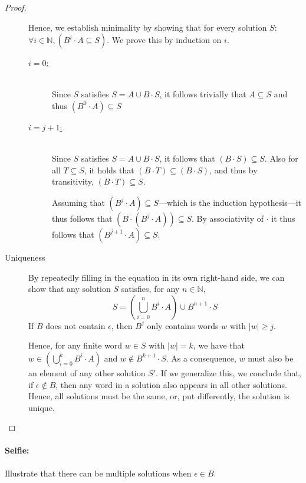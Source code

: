 \begin{proof}
\begin{description}
  Hence, we establish minimality by showing that for every solution $S$: $\forall i \in \mathbb{N}, (B^i \cdot A \subseteq S)$.
  We prove this by induction on $i$.
  \begin{description}
  \item[\underline{$i = 0$:}] \ \\
    Since $S$ satisfies $S = A \cup B \cdot S$, it follows trivially that $A \subseteq S$ and thus
    $(B^0 \cdot A) \subseteq S$
  \item[\underline{$i = j + 1$:}] \ \\
    Since $S$ satisfies $S = A \cup B \cdot S$, it follows that $(B \cdot S) \subseteq S$.
    Also for all $T \subseteq S$, it holds that $(B \cdot T) \subseteq (B \cdot S)$, and thus
    by transitivity, $(B \cdot T) \subseteq S$.

    Assuming that $(B^{j} \cdot A) \subseteq S$---which is the induction hypothesis---it thus follows that 
    $(B \cdot (B^j \cdot A)) \subseteq S$. By associativity of $\cdot$ it thus follows that
    $(B^{j+1} \cdot A) \subseteq S$.

  \end{description}

\item[Uniqueness]

   By repeatedly filling in the equation in its own right-hand side, we can show that any solution $S$ satisfies,
   for any $n \in \mathbb{N}$,
   \begin{equation*}
   S = (\bigcup_{i = 0}^n B^i \cdot A) \cup B^{n+1} \cdot S
   \end{equation*}
   If $B$ does not contain $\epsilon$, then $B^j$ only contains words $w$ with $|w| \geq j$.

   Hence, for any finite word $w \in S$ with $|w| = k$, we have that $w \in (\bigcup_{i = 0}^k B^i \cdot A)$
   and $w \not\in B^{k+1} \cdot S$. As a consequence, $w$ must also be an element of any other solution $S'$.
   If we generalize this, we conclude that, if $\epsilon \not\in B$, then any word in a solution also appears
   in all other solutions. Hence, all solutions must be the same, or, put differently, the solution is unique.

\end{description}

\end{proof}

\paragraph{Selfie:} Illustrate that there can be multiple solutions when $\epsilon \in B$. 


